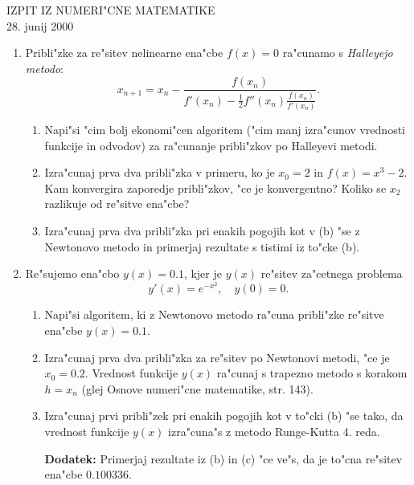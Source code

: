 

\begin{center}
  {\Large {IZPIT IZ NUMERI"CNE MATEMATIKE}}\\
   28. junij 2000
\end{center}

\vspace{1cm}

\begin{enumerate}

  \item Pribli"zke za re"sitev nelinearne ena"cbe $f(x)=0$ 
  ra"cunamo  s {\sl Halleyejo metodo}:
  $$x_{n+1}=x_n-\frac{f(x_n)}{f'(x_n)-\frac{1}{2}f''(x_n)
  \frac{f(x_n)}{f'(x_n)}}.$$

  \begin{enumerate}
   
   \item Napi"si "cim bolj ekonomi"cen algoritem ("cim manj izra"cunov 
   vrednosti funkcije in odvodov) za ra"cunanje
   pribli"zkov po Halleyevi metodi.

   \item Izra"cunaj prva dva pribli"zka v primeru, ko je
   $x_0=2$ in $f(x)=x^3-2$. Kam konvergira zaporedje pribli"zkov,
   "ce je konvergentno? Koliko se $x_2$ razlikuje od re"sitve 
    ena"cbe?
    

   \item Izra"cunaj prva dva pribli"zka pri enakih pogojih kot v (b)
   "se z Newtonovo metodo in primerjaj rezultate s tistimi iz to"cke (b).

  \end{enumerate}
 
  \item Re"sujemo ena"cbo $y(x)=0.1$, kjer je $y(x)$
  re"sitev za"cetnega problema 
  $$y'(x)=e^{-x^2},\quad y(0)=0.$$

\begin{enumerate}
  \item Napi"si algoritem, ki z Newtonovo metodo ra"cuna 
  pribli"zke re"sitve ena"cbe $y(x)=0.1$.

  \item Izra"cunaj prva dva pribli"zka za re"sitev po Newtonovi 
  metodi, "ce je $x_0=0.2$. Vrednost funkcije $y(x)$ 
  ra"cunaj s trapezno metodo s korakom $h=x_n$ (glej Osnove numeri"cne
  matematike, str. 143).
  
  \item Izra"cunaj prvi pribli"zek pri enakih pogojih kot
  v to"cki (b) "se tako, da vrednost funkcije $y(x)$ 
  izra"cuna"s z metodo Runge-Kutta 4. reda.

  \item[\bf{Dodatek}:] Primerjaj rezultate iz (b) in (c) "ce ve"s, da je 
  to"cna re"sitev ena"cbe $0.100336$.
\end{enumerate}
  

\end{enumerate}


